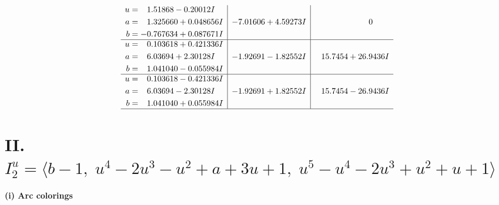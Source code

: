 \documentclass[1p]{elsarticle_modified}
\theoremstyle{definition}
\begin{document}
$$\begin{array}{c|c|c}
\begin{aligned}
u &= \phantom{-}1.51868 - 0.20012 I \\
a &= \phantom{-}1.325660 + 0.048656 I \\
b &= -0.767634 + 0.087671 I\end{aligned}
 & -7.01606 + 4.59273 I & \phantom{-0.000000 } 0 \\ \hline\begin{aligned}
u &= \phantom{-}0.103618 + 0.421336 I \\
a &= \phantom{-}6.03694 + 2.30128 I \\
b &= \phantom{-}1.041040 - 0.055984 I\end{aligned}
 & -1.92691 - 1.82552 I & \phantom{-}15.7454 + 26.9436 I \\ \hline\begin{aligned}
u &= \phantom{-}0.103618 - 0.421336 I \\
a &= \phantom{-}6.03694 - 2.30128 I \\
b &= \phantom{-}1.041040 + 0.055984 I\end{aligned}
 & -1.92691 + 1.82552 I & \phantom{-}15.7454 - 26.9436 I\\
 \hline 
 \end{array}$$\newpage\newpage\renewcommand{\arraystretch}{1}
\centering \section*{II. $I^u_{2}= \langle b-1,\;u^4-2 u^3- u^2+a+3 u+1,\;u^5- u^4-2 u^3+u^2+u+1 \rangle$}
\flushleft \textbf{(i) Arc colorings}\\
\end{document}
